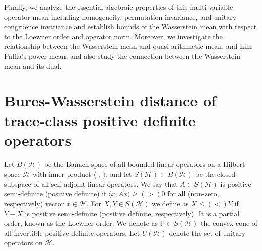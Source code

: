 \documentclass[12pt,reqno]{amsart}
\begin{document}
Finally, we analyze the essential algebraic properties of this multi-variable operator mean including homogeneity, permutation invariance, and unitary congruence invariance and establish bounds of the Wasserstein mean with respect to the Loewner order and operator norm.
Moreover, we investigate the relationship between the Wasserstein mean and quasi-arithmetic mean, and Lim-P\'{a}lfia's power mean, and also study the connection between the Wasserstein mean and its dual.




\section{Bures-Wasserstein distance of trace-class positive definite operators}


Let $B(\mathcal{H})$ be the Banach space of all bounded linear operators on a Hilbert space $\mathcal{H}$ with inner product $\langle \cdot, \cdot \rangle$, and let $S(\mathcal{H}) \subset B(\mathcal{H})$ be the closed subspace of all self-adjoint linear operators. We say that $A \in S(\mathcal{H})$ is positive semi-definite (positive definite) if $\langle x, Ax \rangle \geq (>) 0$ for all (non-zero, respectively) vector $x \in \mathcal{H}$. For $X, Y \in S(\mathcal{H})$ we define as $X \leq (<) Y$ if $Y - X$ is positive semi-definite (positive definite, respectively). It is a partial order, known as the Loewner order.
We denote as $\mathbb{P} \subset S(\mathcal{H})$ the convex cone of all invertible positive definite operators. Let $U(\mathcal{H})$ denote the set of unitary operators on $\mathcal{H}$.

%
%
%
\end{document}
